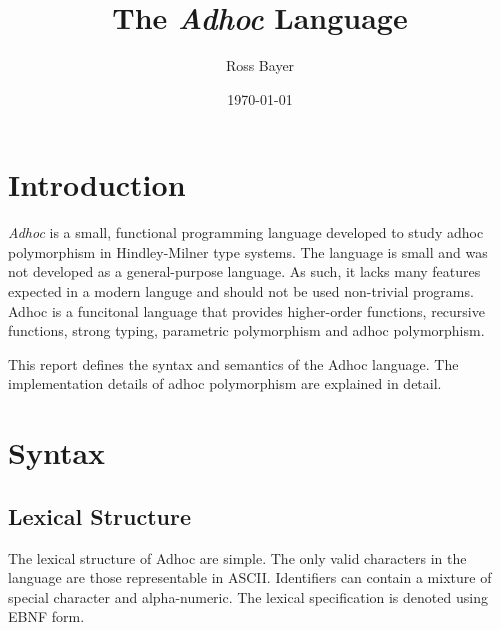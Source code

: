 \documentclass[11pt,a4paper]{article}
\title{The \textit{Adhoc} Language}
\author{Ross Bayer}
\date{\today}
\begin{document}
\maketitle



\section{Introduction}

\textit{Adhoc} is a small, functional programming language developed to study
adhoc polymorphism in Hindley-Milner type systems. The language is small and
was not developed as a general-purpose language. As such, it lacks many features
expected in a modern languge and should not be used non-trivial programs. Adhoc
is a funcitonal language that provides higher-order functions, recursive
functions, strong typing, parametric polymorphism and adhoc polymorphism.

This report defines the syntax and semantics of the Adhoc language. The
implementation details of adhoc polymorphism are explained in detail.



\section{Syntax}


\subsection{Lexical Structure}

The lexical structure of Adhoc are simple. The only valid characters in the
language are those representable in ASCII. Identifiers can contain a mixture of
special character and alpha-numeric. The lexical specification is denoted using
EBNF form.

\end{document}
